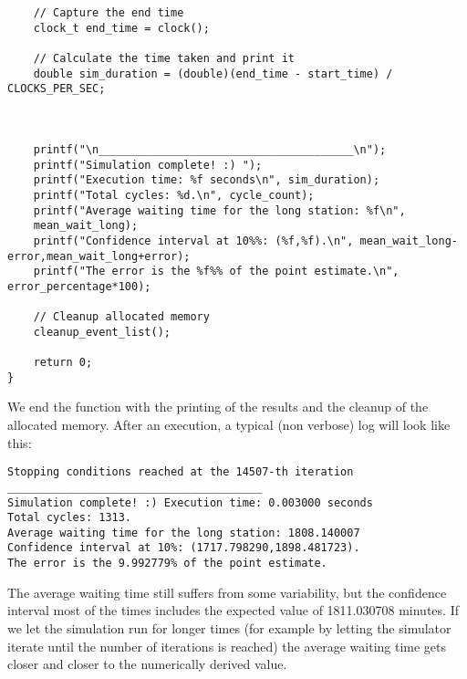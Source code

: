 \documentclass[12pt]{article}
\begin{document}
\begin{lstlisting}
	// Capture the end time
	clock_t end_time = clock();
	
	// Calculate the time taken and print it
	double sim_duration = (double)(end_time - start_time) / CLOCKS_PER_SEC;
	
	
	
	printf("\n_______________________________________\n");
	printf("Simulation complete! :) ");
	printf("Execution time: %f seconds\n", sim_duration);
	printf("Total cycles: %d.\n", cycle_count);
	printf("Average waiting time for the long station: %f\n",
	mean_wait_long);
	printf("Confidence interval at 10%%: (%f,%f).\n", mean_wait_long-error,mean_wait_long+error);
	printf("The error is the %f%% of the point estimate.\n", error_percentage*100);
	
	// Cleanup allocated memory
	cleanup_event_list();
	
	return 0;
}
\end{lstlisting}
We end the function with the printing of the results and the cleanup of the allocated memory. After an execution, a typical (non verbose) log will look like this:
\begin{verbatim}
Stopping conditions reached at the 14507-th iteration
_______________________________________
Simulation complete! :) Execution time: 0.003000 seconds
Total cycles: 1313.
Average waiting time for the long station: 1808.140007
Confidence interval at 10%: (1717.798290,1898.481723).
The error is the 9.992779% of the point estimate.
\end{verbatim}
The average waiting time still suffers from some variability, but the confidence interval most of the times includes the expected value of 1811.030708 minutes. If we let the simulation run for longer times (for example by letting the simulator iterate until the  number of iterations is reached) the average waiting time gets closer and closer to the numerically derived value.
\end{document}
